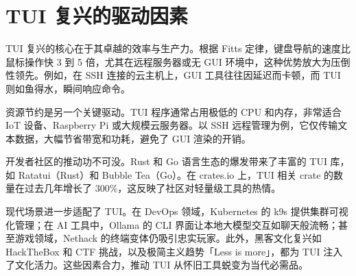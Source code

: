 \chapter{TUI 复兴的驱动因素}
TUI 复兴的核心在于其卓越的效率与生产力。根据 Fitts 定律，键盘导航的速度比鼠标操作快 3 到 5 倍，尤其在远程服务器或无 GUI 环境中，这种优势放大为压倒性领先。例如，在 SSH 连接的云主机上，GUI 工具往往因延迟而卡顿，而 TUI 则如鱼得水，瞬间响应命令。\par
资源节约是另一个关键驱动。TUI 程序通常占用极低的 CPU 和内存，非常适合 IoT 设备、Raspberry Pi 或大规模云服务器。以 SSH 远程管理为例，它仅传输文本数据，大幅节省带宽和功耗，避免了 GUI 渲染的开销。\par
开发者社区的推动功不可没。Rust 和 Go 语言生态的爆发带来了丰富的 TUI 库，如 Ratatui（Rust）和 Bubble Tea（Go）。在 crates.io 上，TUI 相关 crate 的数量在过去几年增长了 300\%{}，这反映了社区对轻量级工具的热情。\par
现代场景进一步适配了 TUI。在 DevOps 领域，Kubernetes 的 k9s 提供集群可视化管理；在 AI 工具中，Ollama 的 CLI 界面让本地大模型交互如聊天般流畅；甚至游戏领域，Nethack 的终端变体仍吸引忠实玩家。此外，黑客文化复兴如 HackTheBox 和 CTF 挑战，以及极简主义趋势「Less is more」，都为 TUI 注入了文化活力。这些因素合力，推动 TUI 从怀旧工具蜕变为当代必需品。\par
